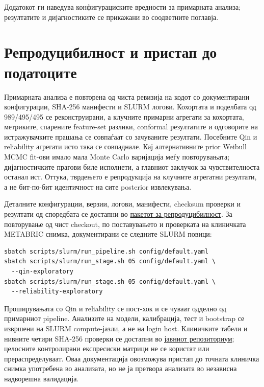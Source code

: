 \documentclass[12pt]{article}
\begin{document}
Додатокот ги наведува конфигурациските вредности за примарната анализа; резултатите и дијагностиките се прикажани во соодветните поглавја.

\section{Репродуцибилност и пристап до податоците}

Примарната анализа е повторена од чиста ревизија на кодот со документирани
конфигурации, SHA-256 манифести и SLURM логови. Кохортата и поделбата од
989/495/495 се реконструирани, а клучните примарни агрегати за кохортата,
метриките, спарените feature-set разлики, conformal резултатите и одговорите на
истражувачките прашања се совпаѓаат со зачуваните резултати. Посебните Qin и
reliability агрегати исто така се совпаднале. Кај алтернативните prior Weibull
MCMC fit-ови имало мала Monte Carlo варијација меѓу повторувањата; дијагностичките
прагови биле исполнети, а главниот заклучок за чувствителноста останал ист.
Оттука, тврдењето е репродукција на клучните агрегатни резултати, а не
бит-по-бит идентичност на сите posterior извлекувања.

Деталните конфигурации, верзии, логови, манифести, checksum проверки и
резултати од споредбата се достапни во
\href{https://github.com/TheeOliver/brca-survival-uncertainty/tree/main/docs/reproducibility/2026-10-30}{пакетот за репродуцибилност}.
За повторување од чист checkout, по поставувањето и проверката на клиничката
METABRIC снимка, документирани се следните SLURM повици:
\begin{verbatim}
sbatch scripts/slurm/run_pipeline.sh config/default.yaml
sbatch scripts/slurm/run_stage.sh 05 config/default.yaml \
  --qin-exploratory
sbatch scripts/slurm/run_stage.sh 05 config/default.yaml \
  --reliability-exploratory
\end{verbatim}
Проширувањата со Qin и reliability се пост-хок и се чуваат одделно од
примарниот pipeline. Анализите на модели, калибрација, тест и bootstrap се
извршени на SLURM compute-јазли, а не на login host. Клиничките табели и нивните
четири SHA-256 проверки се достапни во
\href{https://github.com/TheeOliver/brca-survival-uncertainty/tree/main/data/raw/cbioportal_brca_metabric}{јавниот репозиториум};
целосните контролирани експресиски матрици не се користат или прераспределуваат.
Оваа документација овозможува пристап до точната клиничка снимка употребена во
анализата, но не ја претвора анализата во независна надворешна валидација.
\end{document}
